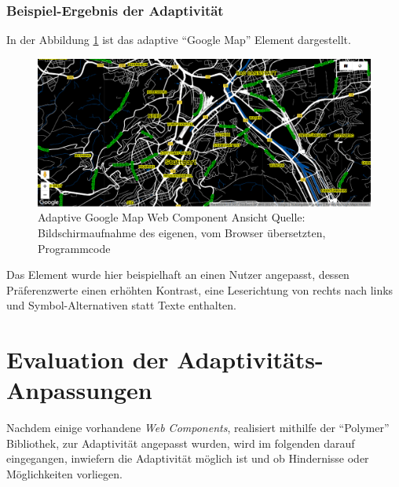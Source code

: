 \documentclass[12pt, paper=a4, bibtotoc, toc=listof, headsepline=true, numbers=endperiod]{scrreprt}
\begin{document}
\subsection{Beispiel-Ergebnis der Adaptivität}
In der Abbildung \ref{img:gmapErg} ist das adaptive \enquote{Google Map} Element  dargestellt.
\begin{figure}[H]		
	\centering
	\includegraphics[width=\textwidth,height=\textheight,keepaspectratio]{gmapErg.png}
	\caption[Adaptive Google Map]{Adaptive Google Map Web Component Ansicht Quelle: Bildschirmaufnahme des eigenen, vom Browser übersetzten, Programmcode}
	\label{img:gmapErg}
\end{figure}\noindent
Das Element wurde hier beispielhaft an einen Nutzer angepasst, dessen Präferenzwerte einen erhöhten Kontrast, eine Leserichtung von rechts nach links und Symbol-Alternativen statt Texte enthalten. 
\newpage

\chapter{Evaluation der Adaptivitäts-Anpassungen}
Nachdem einige vorhandene \emph{Web Components}, realisiert mithilfe der \enquote{Polymer} Bibliothek, zur Adaptivität angepasst wurden, wird im folgenden darauf eingegangen, inwiefern die Adaptivität möglich ist und ob Hindernisse oder Möglichkeiten vorliegen.
\end{document}
